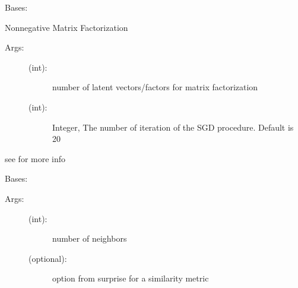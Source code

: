 \documentclass[letterpaper,10pt,english,openany,oneside]{sphinxmanual}
\begin{document}
\begin{fulllineitems}
\label{\detokenize{stl:methods.matrix_factorization.MF.NonNegative_MF}}
Bases: 

Nonnegative Matrix Factorization
\begin{description}
\item[{Args:}] \leavevmode\begin{description}
\item[{ (int): }] \leavevmode
number of latent vectors/factors for matrix factorization

\item[{ (int): }] \leavevmode
Integer, The number of iteration of the SGD procedure. Default is 20

\end{description}

\end{description}

see  for more info

\end{fulllineitems}


\begin{fulllineitems}
\label{\detokenize{stl:methods.knn.KNN.KNN_Basic}}
Bases: 
\begin{description}
\item[{Args:}] \leavevmode\begin{description}
\item[{ (int):}] \leavevmode
number of neighbors

\item[{ (optional):}] \leavevmode
option from surprise for a similarity metric

\end{description}

\end{description}

\end{fulllineitems}
\end{document}
